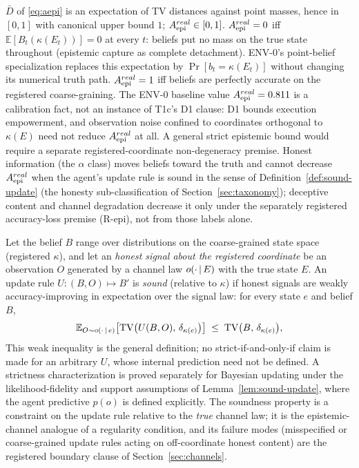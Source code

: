 \begin{proposition}[$\Aepi$]\label{prop:wd-epi}
$\bar D$ of \eqref{eq:aepi} is an expectation of TV distances against point
masses, hence in $[0,1]$ with canonical upper bound $1$; $A_{\mathrm{epi}}^{real}\in[0,1]$.
$A_{\mathrm{epi}}^{real}=0$ iff $\mathbb{E}[B_t(\kappa(E_t))]=0$ at every $t$: beliefs
put no mass on the true state throughout (epistemic capture as complete
detachment). ENV-0's point-belief specialization replaces this expectation
by $\Pr[b_t=\kappa(E_t)]$ without changing its numerical truth path.
$A_{\mathrm{epi}}^{real}=1$ iff beliefs are perfectly accurate on the registered
coarse-graining. The ENV-0 baseline value $A_{\mathrm{epi}}^{real}=0.811$ is a
calibration fact, not an instance of T1c's D1 clause: D1 bounds execution
empowerment, and observation noise confined to coordinates orthogonal to
$\kappa(E)$ need not reduce $A_{\mathrm{epi}}^{real}$ at all. A general strict epistemic
bound would require a separate registered-coordinate non-degeneracy premise.
Honest
information (the $\alpha$ class) moves beliefs toward the truth and cannot
decrease $A_{\mathrm{epi}}^{real}$ when the agent's update rule is sound in the sense of
Definition~\ref{def:sound-update} (the honesty
sub-classification of Section~\ref{sec:taxonomy}); deceptive content and
channel degradation decrease it only under the separately registered
accuracy-loss premise (R-epi), not from those labels alone.
\end{proposition}

\begin{definition}\label{def:sound-update}
Let the belief $B$ range over distributions on the coarse-grained state space
(registered $\kappa$), and let an \emph{honest signal about the registered
coordinate} be an observation $O$ generated by a channel law
$o(\cdot\,|\, E)$ with the true state $E$. An update rule
$U:(B,O)\mapsto B'$ is \emph{sound} (relative to $\kappa$) if honest signals
are weakly accuracy-improving in expectation over the signal law: for every
state $e$ and belief $B$,
\[
\mathbb{E}_{O\sim o(\cdot\,|\, e)}\bigl[\mathrm{TV}\bigl(U(B,O),\,\delta_{\kappa(e)}\bigr)\bigr]
\;\le\; \mathrm{TV}\bigl(B,\,\delta_{\kappa(e)}\bigr),
\]
This weak inequality is the general definition; no strict-if-and-only-if
claim is made for an arbitrary $U$, whose internal prediction need not be
defined. A strictness characterization is proved separately for Bayesian
updating under the likelihood-fidelity and support assumptions of
Lemma~\ref{lem:sound-update}, where the agent predictive $p(o)$ is defined
explicitly. The soundness property is a constraint on the update rule relative to the
\emph{true} channel law; it is the epistemic-channel analogue of a
regularity condition, and its failure modes (misspecified or coarse-grained
update rules acting on off-coordinate honest content) are the registered
boundary clause of Section~\ref{sec:channels}.
\end{definition}

